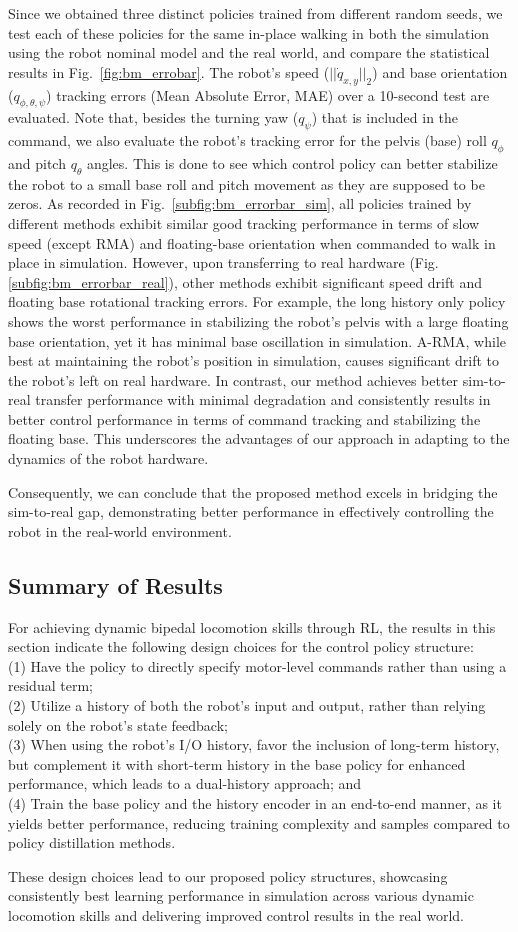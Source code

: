 Since we obtained three distinct policies trained from different random seeds, we test each of these policies for the same in-place walking in both the simulation using the robot nominal model and the real world, and compare the statistical results in Fig.~\ref{fig:bm_errobar}.  
The robot's speed ($||\dot{q}_{x,y}||_2$) and base orientation ($q_{\phi,\theta,\psi}$) tracking errors (Mean Absolute Error, MAE) over a 10-second test are evaluated. 
Note that, besides the turning yaw ($q_{\psi}$) that is included in the command, we also evaluate the robot's tracking error for the pelvis (base) roll $q_{\phi}$ and pitch $q_{\theta}$ angles. This is done to see which control policy can better stabilize the robot to a small base roll and pitch movement as they are supposed to be zeros. 
As recorded in Fig.~\ref{subfig:bm_errorbar_sim}, all policies trained by different methods exhibit similar good tracking performance in terms of slow speed (except RMA) and floating-base orientation when commanded to walk in place in simulation. 
However, upon transferring to real hardware (Fig.\ref{subfig:bm_errorbar_real}), other methods exhibit significant speed drift and floating base rotational tracking errors.
For example, the long history only policy shows the worst performance in stabilizing the robot's pelvis with a large floating base orientation, yet it has minimal base oscillation in simulation. A-RMA, while best at maintaining the robot's position in simulation, causes significant drift to the robot's left on real hardware. In contrast, our method achieves better sim-to-real transfer performance with minimal degradation and consistently results in better control performance in terms of command tracking and stabilizing the floating base. This underscores the advantages of our approach in adapting to the dynamics of the robot hardware. 

Consequently, we can conclude that the proposed method excels in bridging the sim-to-real gap, demonstrating better performance in effectively controlling the robot in the real-world environment.




\subsection{Summary of Results}
For achieving dynamic bipedal locomotion skills through RL, the results in this section indicate the following design choices for the control policy structure:\\
(1) Have the policy to directly specify motor-level commands rather than using a residual term;\\
(2) Utilize a history of both the robot's input and output, rather than relying solely on the robot's state feedback;\\
(3) When using the robot's I/O history, favor the inclusion of long-term history, but complement it with short-term history in the base policy for enhanced performance, which leads to a dual-history approach; and\\
(4) Train the base policy and the history encoder in an end-to-end manner, as it yields better performance, reducing training complexity and samples compared to policy distillation methods.

These design choices lead to our proposed policy structures, showcasing consistently best learning performance in simulation across various dynamic locomotion skills and delivering improved control results in the real world.